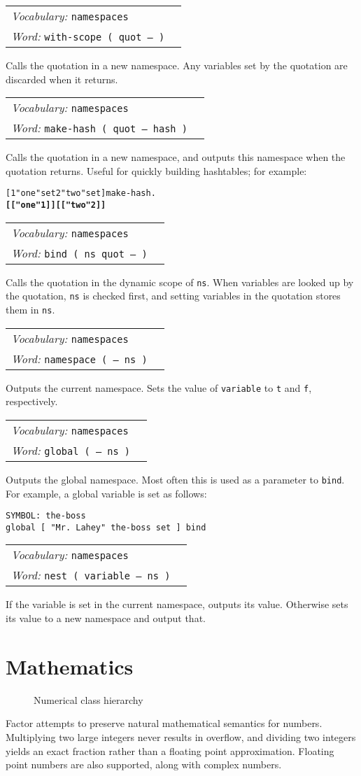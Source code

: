 \documentclass{book}
\newcommand{\tto}{\symbol{123}}
\newcommand{\ttc}{\symbol{125}}
\newcommand{\vocabulary}[1]{\emph{Vocabulary:} \texttt{#1}&\\}
\newcommand{\ordinaryword}[2]{\index{\texttt{#1}}\emph{Word:} \texttt{#2}&\\}
\newcommand{\wordtable}[1]{


\begin{tabularx}{12cm}{lX}
\hline
#1
\hline
\end{tabularx}

}
\begin{document}
\wordtable{
\vocabulary{namespaces}
\ordinaryword{with-scope}{with-scope ( quot -- )}
}
Calls the quotation in a new namespace. Any variables set by the quotation are discarded when it returns.
\wordtable{
\vocabulary{namespaces}
\ordinaryword{make-hash}{make-hash ( quot -- hash )}
}
Calls the quotation in a new namespace, and outputs this namespace when the quotation returns. Useful for quickly building hashtables; for example:
\begin{alltt}
  [ 1 "one" set 2 "two" set ] make-hash .
\textbf{\tto\tto [[ "one" 1 ]] [[ "two" 2 ]] \ttc\ttc}
\end{alltt}

\wordtable{
\vocabulary{namespaces}
\ordinaryword{bind}{bind ( ns quot -- )}
}
Calls the quotation in the dynamic scope of \texttt{ns}. When variables are looked up by the quotation, \texttt{ns} is checked first, and setting variables in the quotation stores them in \texttt{ns}.
\wordtable{
\vocabulary{namespaces}
\ordinaryword{namespace}{namespace ( -- ns )}
}
Outputs the current namespace.
Sets the value of \texttt{variable} to \texttt{t} and \texttt{f}, respectively.
\wordtable{
\vocabulary{namespaces}
\ordinaryword{global}{global ( -- ns )}
}
Outputs the global namespace. Most often this is used as a parameter to \texttt{bind}. For example, a global variable is set as follows:
\begin{verbatim}
SYMBOL: the-boss
global [ "Mr. Lahey" the-boss set ] bind
\end{verbatim}
\wordtable{
\vocabulary{namespaces}
\ordinaryword{nest}{nest ( variable -- ns )}
}
If the variable is set in the current namespace, outputs its value. Otherwise sets its value to a new namespace and output that.

\chapter{Mathematics}

\numberglos

\begin{figure}
\caption{Numerical class hierarchy}
\begin{center}
\end{center}
\end{figure}

Factor attempts to preserve natural mathematical semantics for numbers. Multiplying two large integers never results in overflow, and dividing two integers yields an exact fraction rather than a floating point approximation. Floating point numbers are also supported, along with complex numbers.
\end{document}
